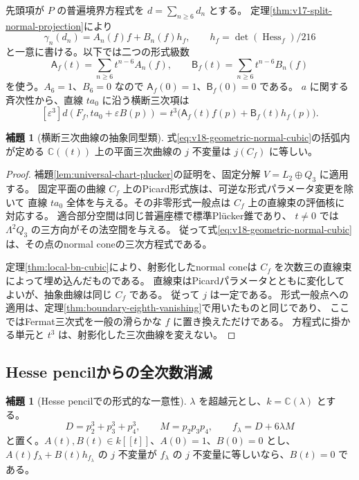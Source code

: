 \documentclass[a4paper,11pt]{ltjsarticle}
\theoremstyle{definition}
\newtheorem{lemma}[theorem]{補題}
\begin{document}
先頭項が $P$ の普遍境界方程式を $d=\sum_{n\ge6}d_n$ とする。
定理\ref{thm:v17-split-normal-projection}により
\[
 \gamma_n(d_n)=A_n(f)f+B_n(f)h_f,
 \qquad h_f=\det(\operatorname{Hess}_f)/216
\]
と一意に書ける。以下では二つの形式級数
\begin{equation}\label{eq:v18-normal-pencil-series}
 \mathsf A_f(t)=\sum_{n\ge6}t^{n-6}A_n(f),\qquad
 \mathsf B_f(t)=\sum_{n\ge6}t^{n-6}B_n(f)
\end{equation}
を使う。$A_6=1$、$B_6=0$ なので
$\mathsf A_f(0)=1$、$\mathsf B_f(0)=0$ である。
$a$ に関する斉次性から、直線 $t a_0$ に沿う横断三次項は
\begin{equation}\label{eq:v18-geometric-normal-cubic}
 [\varepsilon^3]d(F_f,t a_0+\varepsilon B(p))
 =t^3\bigl(\mathsf A_f(t)f(p)+\mathsf B_f(t)h_f(p)\bigr).
\end{equation}

\begin{lemma}[横断三次曲線の抽象同型類]
\label{lem:v18-fixed-plane-normal-j}
式\eqref{eq:v18-geometric-normal-cubic}の括弧内が定める
$\mathbb C((t))$ 上の平面三次曲線の $j$ 不変量は $j(C_f)$ に等しい。
\end{lemma}

\begin{proof}
補題\ref{lem:universal-chart-plucker}の証明を、固定分解
$V=L_2\oplus Q_3$ に適用する。
固定平面の曲線 $C_f$ 上のPicard形式族は、可逆な形式パラメータ変更を除いて
直線 $t a_0$ 全体を与える。その非零形式一般点は $C_f$ 上の直線束の評価核に対応する。
適合部分空間は同じ普遍座標で標準Pl\"ucker錐であり、
$t\ne0$ では $\Lambda^2Q_3$ の三方向がその法空間を与える。
従って式\eqref{eq:v18-geometric-normal-cubic}は、その点のnormal coneの三次方程式である。

定理\ref{thm:local-bn-cubic}により、射影化したnormal coneは
$C_f$ を次数三の直線束によって埋め込んだものである。
直線束はPicardパラメータとともに変化してよいが、抽象曲線は同じ $C_f$ である。
従って $j$ は一定である。
形式一般点への適用は、定理\ref{thm:boundary-eighth-vanishing}で用いたものと同じであり、
ここではFermat三次式を一般の滑らかな $f$ に置き換えただけである。
方程式に掛かる単元と $t^3$ は、射影化した三次曲線を変えない。
\end{proof}

\subsection{Hesse pencilからの全次数消滅}

\begin{lemma}[Hesse pencilでの形式的な一意性]
\label{lem:v18-hesse-formal-rigidity}
$\lambda$ を超越元とし、$k=\mathbb C(\lambda)$ とする。
\[
 D=p_2^3+p_3^3+p_4^3,\qquad M=p_2p_3p_4,\qquad
 f_\lambda=D+6\lambda M
\]
と置く。$A(t),B(t)\in k[[t]]$、$A(0)=1$、$B(0)=0$ とし、
$A(t)f_\lambda+B(t)h_{f_\lambda}$ の $j$ 不変量が
$f_\lambda$ の $j$ 不変量に等しいなら、$B(t)=0$ である。
\end{lemma}
\end{document}
